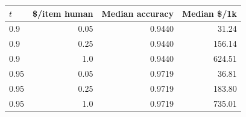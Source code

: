\begin{tabular}{lrrr}
\toprule
$t$ & \$/item human & Median accuracy & Median \$/1k \\
\midrule
0.9 & 0.05 & 0.9440 & 31.24 \\
0.9 & 0.25 & 0.9440 & 156.14 \\
0.9 & 1.0 & 0.9440 & 624.51 \\
0.95 & 0.05 & 0.9719 & 36.81 \\
0.95 & 0.25 & 0.9719 & 183.80 \\
0.95 & 1.0 & 0.9719 & 735.01 \\
\bottomrule
\end{tabular}
